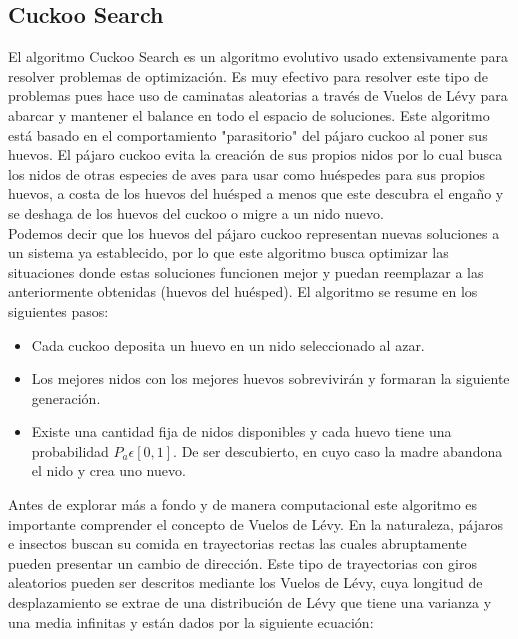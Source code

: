 \documentclass{article}
\begin{document}
\subsection{Cuckoo Search}

El algoritmo Cuckoo Search es un algoritmo evolutivo usado extensivamente para resolver problemas de optimización. Es muy efectivo para resolver este tipo de problemas pues hace uso de caminatas aleatorias a través de Vuelos de Lévy para abarcar y mantener el balance en todo el espacio de soluciones. Este algoritmo está basado en el comportamiento "parasitorio" del pájaro cuckoo al poner sus huevos. El pájaro cuckoo evita la creación de sus propios nidos por lo cual busca los nidos de otras especies de aves para usar como huéspedes para sus propios huevos, a costa de los huevos del huésped a menos que este descubra el engaño y se deshaga de los huevos del cuckoo o migre a un nido nuevo.\\

Podemos decir que los huevos del pájaro cuckoo representan nuevas soluciones a un sistema ya establecido, por lo que este algoritmo busca optimizar las situaciones donde estas soluciones funcionen mejor y puedan reemplazar a las anteriormente obtenidas (huevos del huésped). El algoritmo se resume en los siguientes pasos:

\begin{itemize}
    \item Cada cuckoo deposita un huevo en un nido seleccionado al azar. 
    \item Los mejores nidos con los mejores huevos sobrevivirán y formaran la siguiente generación. 
    \item Existe una cantidad fija de nidos disponibles y cada huevo tiene una
probabilidad $P_a  \epsilon [0 , 1]$. De ser descubierto, en
cuyo caso la madre abandona el nido y crea uno nuevo. 

\end{itemize}

Antes de explorar más a fondo y de manera computacional este algoritmo es importante comprender el concepto de Vuelos de Lévy. En la naturaleza, pájaros e insectos buscan su comida en trayectorias rectas las cuales abruptamente pueden presentar un cambio de dirección. Este tipo de trayectorias con giros aleatorios pueden ser descritos mediante los Vuelos de Lévy,  cuya longitud de
desplazamiento se extrae de una distribución de Lévy que tiene una varianza y una media
infinitas y están dados por la siguiente ecuación:
\end{document}

